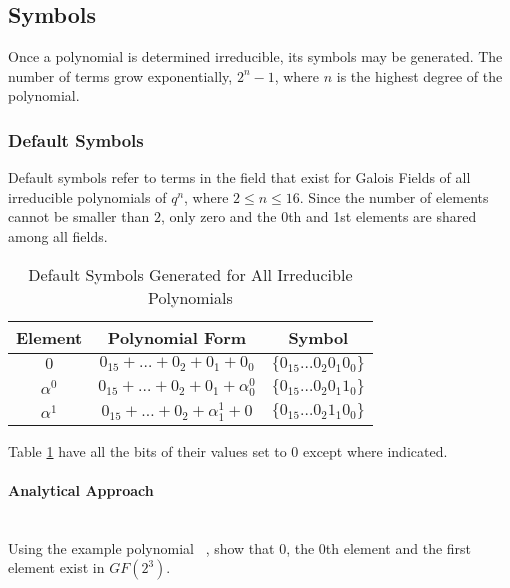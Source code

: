 \subsection{Symbols}

    Once a polynomial is determined irreducible, its symbols may be generated.
    The number of terms grow exponentially, $2^{n}-1$, where $n$ is the highest
    degree of the polynomial.

    \subsubsection{Default Symbols}

    Default symbols refer to terms in the field that exist for Galois Fields of
    all irreducible polynomials of $q^n$, where $2 \leq n
    \leq 16$. Since the number of elements cannot be smaller than $2$, only
    zero and the 0th and 1st elements are shared among all fields.

    \begin{table}[h]
        \def\arraystretch{2.5}
        \caption{Default Symbols Generated for All Irreducible Polynomials}
        \centering
        \begin{tabular*}{300pt}{@{\extracolsep{\fill}} ccc}

        \textbf{Element} & \textbf{Polynomial Form} & \textbf{Symbol}
        \\
        \hline $0$ & $0_{15} + \ldots + 0_{2} + 0_{1} + 0_{0}$ & $\{ 0_{15}
        \ldots 0_{2} 0_{1} 0_{0} \}$ \\

        $\alpha^{0}$ & $0_{15} + \ldots + 0_{2} + 0_{1} +
        \alpha^{0}_{0}$ & $\{0_{15} \ldots 0_{2} 0_{1} 1_{0} \}$ \\

        $\alpha^{1}$ & $0_{15} + \ldots + 0_{2} + \alpha^{1}_{1} + 0$ & $\{
        0_{15} \ldots 0_{2} 1_{1} 0_{0} \}$ \\

        \end{tabular*}
        \label{table:default_sym}
    \end{table}

    Table \ref{table:default_sym} have all the bits of their values set to $0$
    except where indicated.

        \paragraph{Analytical Approach} \leavevmode\\ Using the example
        polynomial \examplepoly~, show that 0, the 0th element and the first
        element exist in $GF(2^{3})$.

